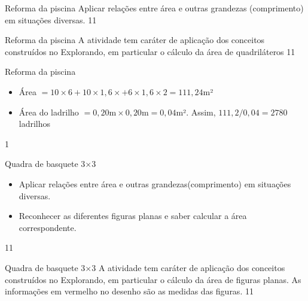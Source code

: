 \def\currentcolor{session2}
\begin{objectives}{Reforma da piscina}
{
  Aplicar relações entre área e outras grandezas (comprimento) em situações diversas. 
}{1}{1}
\end{objectives}
\begin{sugestions}{Reforma da piscina}
{
  A atividade tem caráter de aplicação dos conceitos construídos no Explorando, em particular o cálculo da área de quadriláteros
}{1}{1}
\end{sugestions}
\begin{answer}{Reforma da piscina}
{
  \begin{itemize}
  \item Área $= 10\times6+10\times 1{,}6\times+6\times1{,}6\times2=111{,}24$m²
  \item Área do ladrilho $=0{,}20\text{m}\times0{,}20\text{m}=0{,}04$m². Assim, $111{,}2/0{,}04=2780$ ladrilhos
  \end{itemize}
}{1}
\end{answer}
\clearpage
\begin{objectives}{Quadra de basquete 3$\times$3}
{
  \begin{itemize}
  \item Aplicar relações entre área e outras grandezas(comprimento) em situações diversas. 
  \item Reconhecer as diferentes figuras planas e saber calcular a área correspondente.
  \end{itemize}
}{1}{1}
\end{objectives}
\begin{sugestions}{Quadra de basquete 3$\times$3}
{
  A atividade tem caráter de aplicação dos conceitos construídos no Explorando, em particular o cálculo da área de figuras planas. As informações em vermelho no desenho são as medidas das figuras.
}{1}{1}
\end{sugestions}
\clearmargin
